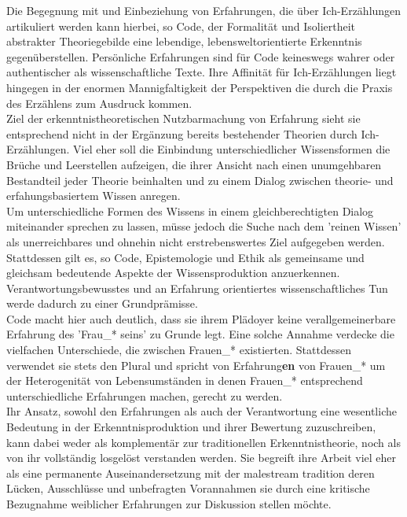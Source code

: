 Die Begegnung mit und Einbeziehung von Erfahrungen, die über Ich-Erzählungen
artikuliert werden kann hierbei, so Code, der Formalität und Isoliertheit
abstrakter Theoriegebilde eine lebendige, lebensweltorientierte Erkenntnis
gegenüberstellen. Persönliche Erfahrungen sind für Code keineswegs wahrer oder
authentischer als wissenschaftliche Texte. Ihre Affinität für Ich-Erzählungen
liegt hingegen in der enormen Mannigfaltigkeit der Perspektiven die durch die
Praxis des Erzählens zum Ausdruck kommen. \\
Ziel der erkenntnistheoretischen
Nutzbarmachung von Erfahrung sieht sie entsprechend nicht in der Ergänzung
bereits bestehender Theorien durch Ich-Erzählungen. Viel eher soll die
Einbindung unterschiedlicher Wissensformen die Brüche und Leerstellen aufzeigen,
die ihrer Ansicht nach einen unumgehbaren Bestandteil jeder Theorie beinhalten
und zu einem Dialog zwischen theorie- und erfahungsbasiertem Wissen anregen.\\
Um unterschiedliche Formen des Wissens in einem gleichberechtigten Dialog
miteinander sprechen zu lassen, müsse jedoch die Suche nach dem 'reinen Wissen'
als unerreichbares und ohnehin nicht erstrebenswertes Ziel aufgegeben
werden.\footnotemark {}\\
Stattdessen gilt es, so Code, Epistemologie und Ethik als gemeinsame und gleichsam bedeutende Aspekte der Wissensproduktion anzuerkennen. Verantwortungsbewusstes und an Erfahrung orientiertes wissenschaftliches Tun werde dadurch zu einer Grundprämisse.\\
Code macht hier auch deutlich, dass sie ihrem Plädoyer keine verallgemeinerbare
Erfahrung des 'Frau\_* seins' zu Grunde legt. Eine solche Annahme verdecke die
vielfachen Unterschiede, die zwischen Frauen\_* existierten. Stattdessen
verwendet sie stets den Plural und spricht von Erfahrung\textbf{en} von Frauen\_* um der
Heterogenität von Lebensumständen in denen Frauen\_* entsprechend
unterschiedliche Erfahrungen machen, gerecht zu werden.\\

\noindent Ihr Ansatz, sowohl den Erfahrungen als auch der Verantwortung eine wesentliche
Bedeutung in der Erkenntnisproduktion und ihrer Bewertung zuzuschreiben, kann
dabei weder als komplementär zur traditionellen Erkenntnistheorie, noch als von
ihr vollständig losgelöst verstanden werden. Sie begreift ihre Arbeit viel eher
als eine permanente Auseinandersetzung mit der malestream tradition deren
Lücken, Ausschlüsse und unbefragten Vorannahmen sie durch eine kritische
Bezugnahme weiblicher Erfahrungen zur Diskussion stellen möchte.\footnotemark
{}\\


